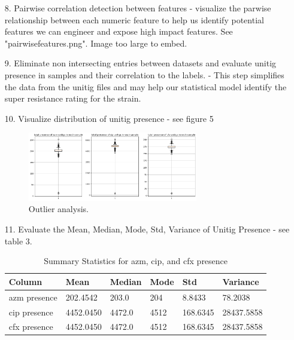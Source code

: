 \documentclass[manuscript,screen,review, nonacm]{acmart}
\begin{document}
\begin{itemize}
    \item[8.] Pairwise correlation detection between features - visualize the parwise relationship between each numeric feature to help us identify 
    potential features we can engineer and expose high impact features. See "pairwisefeatures.png". Image too large to embed. 

    \item[9.] Eliminate non intersecting entries between datasets and evaluate unitig presence in samples and their correlation to the labels. - This step simplifies the data from the unitig files 
    and  may help our statistical model identify the super resistance rating for the strain.

    \item[10.] Visualize distribution of unitig presence - see figure 5

        \begin{figure}[H]
                \centering
                \vspace{-10pt}
                \includegraphics[width=0.7\textwidth]{figures/unitigdis.png}
                \caption{Outlier analysis.}
                \vspace{-10pt}
        \end{figure}

    \item[11.] Evaluate the Mean, Median, Mode, Std, Variance of Unitig Presence - see table 3.
        \begin{table}[H]
            \centering
            \begin{tabular}{|l|l|l|l|l|l|}
            \hline
            \textbf{Column}       & \textbf{Mean}    & \textbf{Median}  & \textbf{Mode}  & \textbf{Std}     & \textbf{Variance} \\ \hline
            azm presence          & 202.4542         & 203.0            & 204            & 8.8433           & 78.2038           \\ \hline
            cip presence          & 4452.0450        & 4472.0           & 4512           & 168.6345         & 28437.5858        \\ \hline
            cfx presence          & 4452.0450        & 4472.0           & 4512           & 168.6345         & 28437.5858        \\ \hline
            \end{tabular}
            \caption{Summary Statistics for azm, cip, and cfx presence}
        \end{table}


\end{itemize}
\end{document}
